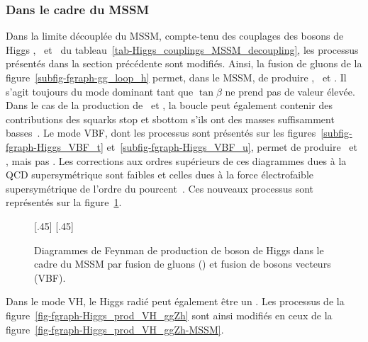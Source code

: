 \subsubsection{Dans le cadre du MSSM}\label{chapter-MS-MSSM-section-pheno_Higgs_MSSM-subsec-production-MSSM}
Dans la limite découplée du MSSM, compte-tenu des couplages des bosons de Higgs \higgs, \Higgs\ et \HiggsA\ du tableau~\ref{tab-Higgs_couplings_MSSM_decoupling}, les processus présentés dans la section précédente sont modifiés.
Ainsi, la fusion de gluons de la figure~\ref{subfig-fgraph-gg_loop_h} permet, dans le MSSM, de produire \higgs, \Higgs\ et \HiggsA.
Il s'agit toujours du mode dominant tant que $\tan\beta$ ne prend pas de valeur élevée.
Dans le cas de la production de \higgs\ et \Higgs, la boucle peut également contenir des contributions des squarks stop et sbottom s'ils ont des masses suffisamment basses~\cite{Dawson_1996}.
Le mode VBF, dont les processus sont présentés sur les figures~\ref{subfig-fgraph-Higgs_VBF_t} et~\ref{subfig-fgraph-Higgs_VBF_u}, permet de produire \higgs\ et \Higgs, mais pas \HiggsA.
Les corrections aux ordres supérieurs de ces diagrammes dues à la QCD supersymétrique sont faibles et celles dues à la force électrofaible supersymétrique de l'ordre du pourcent~\cite{Higgs_xsec_book_1}.
Ces nouveaux processus sont représentés sur la figure~\ref{fig-fgraph-Higgs_prod_ggh_VBF-MSSM}.
\begin{figure}[h]
\centering
\vspace{\baselineskip}
[.45\textwidth]
{\vspace{\baselineskip}}
\hfill
{}[.45\textwidth]
{\vspace{\baselineskip}}
\caption[Production de boson de Higgs du MSSM par fusion de gluons et de bosons vecteurs.]{Diagrammes de Feynman de production de boson de Higgs dans le cadre du MSSM par fusion de gluons (\gluon\gluon\Higgs) et fusion de bosons vecteurs (VBF).}
\label{fig-fgraph-Higgs_prod_ggh_VBF-MSSM}
\end{figure}
\par Dans le mode VH, le Higgs radié peut également être un \Higgs.
Les processus de la figure~\ref{fig-fgraph-Higgs_prod_VH_ggZh} sont ainsi modifiés en ceux de la figure~\ref{fig-fgraph-Higgs_prod_VH_ggZh-MSSM}.
